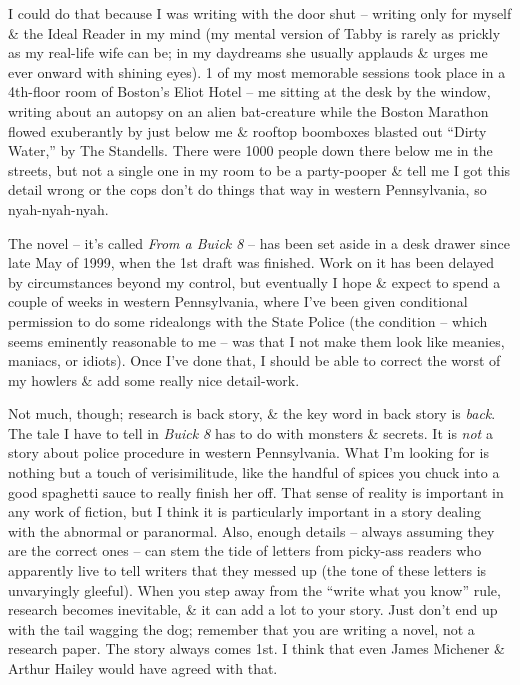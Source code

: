 \documentclass{article}
\numberwithin{equation}{section}
\begin{document}
I could do that because I was writing with the door shut -- writing only for myself \& the Ideal Reader in my mind (my mental version of Tabby is rarely as prickly as my real-life wife can be; in my daydreams she usually applauds \& urges me ever onward with shining eyes). 1 of my most memorable sessions took place in a 4th-floor room of Boston's Eliot Hotel -- me sitting at the desk by the window, writing about an autopsy on an alien bat-creature while the Boston Marathon flowed exuberantly by just below me \& rooftop boomboxes blasted out ``Dirty  Water,'' by The Standells. There were 1000 people down there below me in the streets, but not a single one in my room to be a party-pooper \& tell me I got this detail wrong or the cops don't do things that way in western Pennsylvania, so nyah-nyah-nyah.

The novel -- it's called \textit{From a Buick 8} -- has been set aside in a desk drawer since late May of 1999, when the 1st draft was finished. Work on it has been delayed by circumstances beyond my control, but eventually I hope \& expect to spend a couple of weeks in western Pennsylvania, where I've been given conditional permission to do some ridealongs with the State Police (the condition -- which seems eminently reasonable to me -- was that I not make them look like meanies, maniacs, or idiots). Once I've done that, I should be able to correct the worst of my howlers \& add some really nice detail-work.

Not much, though; research is back story, \& the key word in back story is \textit{back}. The tale I have to tell in \textit{Buick 8} has to do with monsters \& secrets. It is \textit{not} a story about police procedure in western Pennsylvania. What I'm looking for is nothing but a touch of verisimilitude, like the handful of spices you chuck into a good spaghetti sauce to really finish her off. That sense of reality is important in any work of fiction, but I think it is particularly important in a story dealing with the abnormal or paranormal. Also, enough details -- always assuming they are the correct ones -- can stem the tide of letters from picky-ass readers who apparently live to tell writers that they messed up (the tone of these letters is unvaryingly gleeful). When you step away from the ``write what you know'' rule, research becomes inevitable, \& it can add a lot to your story. Just don't end up with the tail wagging the dog; remember that you are writing a novel, not a research paper. The story always comes 1st. I think that even James Michener \& Arthur Hailey would have agreed with that.
\end{document}
